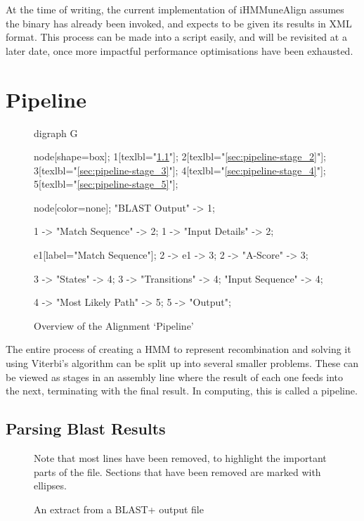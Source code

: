At the time of writing, the current implementation of iHMMuneAlign assumes the  binary has already been invoked, and expects to be given its results in XML format. This process can be made into a script easily, and will be revisited at a later date, once more impactful performance optimisations have been exhausted.

\section{Pipeline}
\label{sec:pipeline}
\begin{figure}
	\label{fig:pipeline}
	\caption{Overview of the Alignment `Pipeline'}
	\centering
	\begin{dot2tex}[autosize]
		digraph G {

			{
				node[shape=box];
                1[texlbl="\ref{sec:pipeline-stage_1}"];
                2[texlbl="\ref{sec:pipeline-stage_2}"];
                3[texlbl="\ref{sec:pipeline-stage_3}"];
                4[texlbl="\ref{sec:pipeline-stage_4}"];
                5[texlbl="\ref{sec:pipeline-stage_5}"];
			}

			{
				node[color=none];
				"BLAST Output" -> 1;

				1 -> "Match Sequence" -> 2;
				1 -> "Input Details" -> 2;

				e1[label="Match Sequence"];
                2 -> e1 -> 3;
                2 -> "A-Score" -> 3;

				3 -> "States" -> 4;
				3 -> "Transitions" -> 4;
                "Input Sequence" -> 4;

				4 -> "Most Likely Path" -> 5;
				5 -> "Output";
			}

		}
	\end{dot2tex}
\end{figure}

The entire process of creating a HMM to represent \igh recombination and solving it using Viterbi's algorithm can be split up into several smaller problems. These can be viewed as stages in an assembly line where the result of each one feeds into the next, terminating with the final result. In computing, this is called a pipeline.

\subsection{Parsing Blast Results}
\label{sec:pipeline-stage_1}
\lstset{basicstyle=\ttfamily\footnotesize,breaklines=true}
\begin{figure}
	\caption{An extract from a BLAST+ output file}
	\label{fig:blast-output}
	
	\small Note that most lines have been removed, to highlight the important parts of the file. Sections that have been removed are marked with ellipses.
\end{figure}

